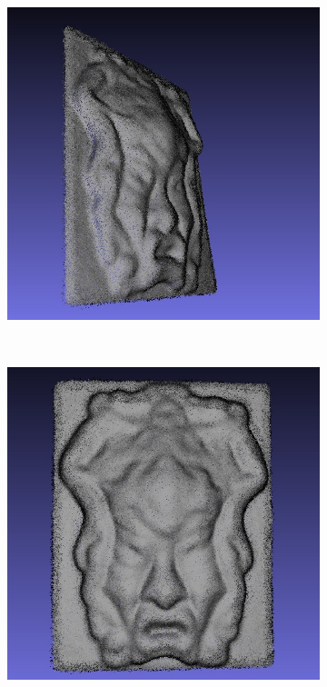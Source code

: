 \documentclass[letterpaper, 10 pt, conference]{ieeeconf}  %
\begin{document}
\begin{figure}[t]
        \centering
        \begin{subfigure}[b]{0.45\linewidth}
                \centering
                \includegraphics[width=\linewidth]{../models/gorgon_gray_model1.jpg}
                \caption{}
        \end{subfigure}%
        ~ %
        \begin{subfigure}[b]{0.45\linewidth}
                \centering
                \includegraphics[width=\linewidth]{../models/gorgon_gray_model.jpg}

\end{subfigure}
\end{figure}
\end{document}

